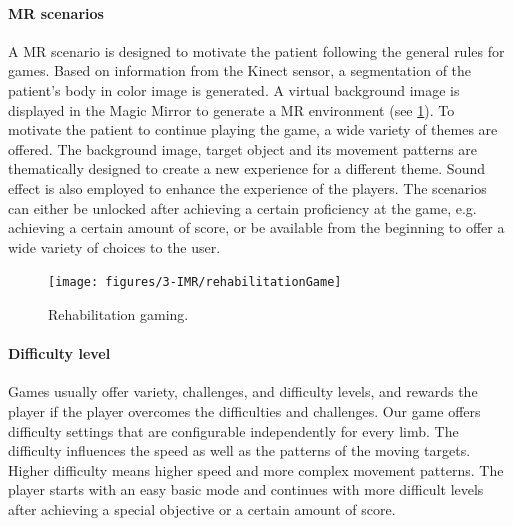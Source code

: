 \paragraph{MR scenarios}
A MR scenario is designed to motivate the patient following the general rules for games. 
Based on information from the Kinect sensor, a segmentation of the patient's body in color image is generated. A virtual background image is displayed in the Magic Mirror to generate a MR environment (see \figurename{\ref{fig:3-IMR:rehabilitationGame}}).  
To motivate the patient to continue playing the game, a wide variety of themes are offered. The background image, target object and its movement patterns are thematically designed to create a new experience for a different theme. Sound effect is also employed to enhance the experience of the players. 
The scenarios can either be unlocked after achieving a certain proficiency at the game, e.g. achieving a certain amount of score, or be available from the beginning to offer a wide variety of choices to the user. 

\begin{figure}
	\centering
	\texttt{[image: figures/3-IMR/rehabilitationGame]}
	\caption{Rehabilitation gaming. }
	\label{fig:3-IMR:rehabilitationGame}
\end{figure}
\paragraph{Difficulty level}
Games usually offer variety, challenges, and difficulty levels, and rewards the player if the player overcomes the difficulties and challenges.
Our game offers difficulty settings that are configurable independently for every limb. The difficulty influences the speed as well as the patterns of the moving targets. Higher difficulty means higher speed and more complex movement patterns.
The player starts with an easy basic mode and continues with more difficult levels after achieving a special objective or a certain amount of score. 

